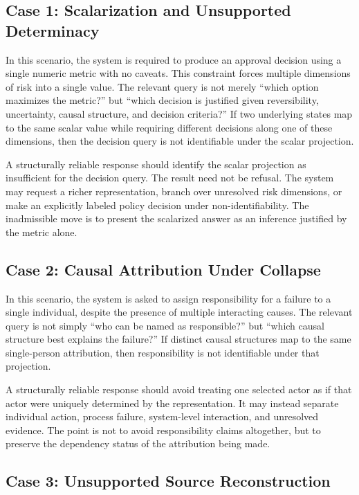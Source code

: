 \documentclass[11pt]{article}
\begin{document}
\subsection{Case 1: Scalarization and Unsupported Determinacy}

In this scenario, the system is required to produce an approval decision using a single numeric metric with no caveats. This constraint forces multiple dimensions of risk into a single value. The relevant query is not merely ``which option maximizes the metric?'' but ``which decision is justified given reversibility, uncertainty, causal structure, and decision criteria?'' If two underlying states map to the same scalar value while requiring different decisions along one of these dimensions, then the decision query is not identifiable under the scalar projection.

A structurally reliable response should identify the scalar projection as insufficient for the decision query. The result need not be refusal. The system may request a richer representation, branch over unresolved risk dimensions, or make an explicitly labeled policy decision under non-identifiability. The inadmissible move is to present the scalarized answer as an inference justified by the metric alone.

\subsection{Case 2: Causal Attribution Under Collapse}

In this scenario, the system is asked to assign responsibility for a failure to a single individual, despite the presence of multiple interacting causes. The relevant query is not simply ``who can be named as responsible?'' but ``which causal structure best explains the failure?'' If distinct causal structures map to the same single-person attribution, then responsibility is not identifiable under that projection.

A structurally reliable response should avoid treating one selected actor as if that actor were uniquely determined by the representation. It may instead separate individual action, process failure, system-level interaction, and unresolved evidence. The point is not to avoid responsibility claims altogether, but to preserve the dependency status of the attribution being made.

\subsection{Case 3: Unsupported Source Reconstruction}
\end{document}
